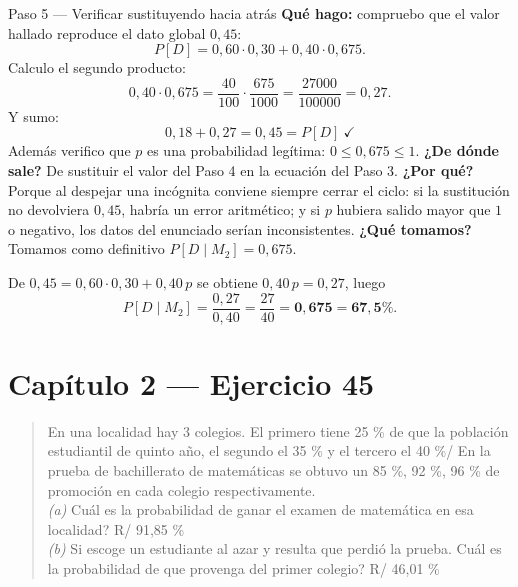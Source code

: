 \documentclass[11pt]{article}
\begin{document}
\begin{sol}
\begin{paso}{Paso 5 --- Verificar sustituyendo hacia atr\'as}
\textbf{Qu\'e hago:} compruebo que el valor hallado reproduce el dato global $0{,}45$:
\[
P[D]=0{,}60\cdot 0{,}30+0{,}40\cdot 0{,}675 .
\]
Calculo el segundo producto:
\[
0{,}40\cdot 0{,}675=\frac{40}{100}\cdot\frac{675}{1000}=\frac{27000}{100000}=0{,}27 .
\]
Y sumo:
\[
0{,}18+0{,}27=0{,}45=P[D]\ \checkmark
\]
Adem\'as verifico que $p$ es una probabilidad leg\'itima: $0\le 0{,}675\le 1$.
\textbf{¿De d\'onde sale?} De sustituir el valor del Paso 4 en la ecuaci\'on del Paso 3.
\textbf{¿Por qu\'e?} Porque al despejar una inc\'ognita conviene siempre cerrar el ciclo: si la sustituci\'on no devolviera $0{,}45$, habr\'ia un error aritm\'etico; y si $p$ hubiera salido mayor que $1$ o negativo, los datos del enunciado ser\'ian inconsistentes.
\textbf{¿Qu\'e tomamos?} Tomamos como definitivo $P[D\mid M_2]=0{,}675$.
\end{paso}

\end{sol}

\begin{resp}
De $0{,}45=0{,}60\cdot 0{,}30+0{,}40\,p$ se obtiene $0{,}40\,p=0{,}27$, luego
\[
P[D\mid M_2]=\frac{0{,}27}{0{,}40}=\frac{27}{40}=\mathbf{0{,}675}=\mathbf{67{,}5\%}.
\]
\end{resp}

\section*{Cap\'itulo 2 --- Ejercicio 45}

\begin{quote}
En una localidad hay 3 colegios. El primero tiene 25 \% de que la poblaci\'on estudiantil de quinto a\~no, el segundo el 35 \% y el tercero el 40 \%/ En la prueba de bachillerato de matem\'aticas se obtuvo un 85 \%, 92 \%, 96 \% de promoci\'on en cada colegio respectivamente.\\
\emph{(a)} Cu\'al es la probabilidad de ganar el examen de matem\'atica en esa localidad? \hfill R/ 91,85 \%\\
\emph{(b)} Si escoge un estudiante al azar y resulta que perdi\'o la prueba. Cu\'al es la probabilidad de que provenga del primer colegio? \hfill R/ 46,01 \%
\end{quote}
\end{document}
